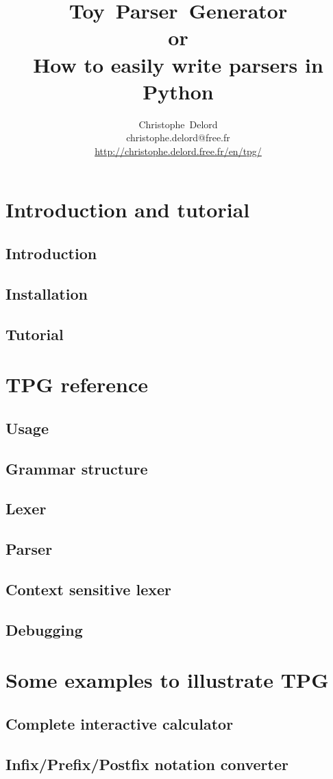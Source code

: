 \documentclass[a4paper,twoside]{report}
\author{
	Christophe~Delord\\
	christophe.delord@free.fr \\
	\url{http://christophe.delord.free.fr/en/tpg/} \\
}
\title{
	Toy~Parser~Generator \\
	or\\
	How to easily write parsers in Python \\
}
\begin{document}
\maketitle
\tableofcontents

\listoffigures

\cleardoublepage
\part{Introduction and tutorial}							\label{tpg:intro}
	\chapter{Introduction}
		
	\chapter{Installation}
		
	\chapter{Tutorial}										\label{tpg:tutorial}
		

\cleardoublepage
\part{TPG reference}										\label{tpg:core}
	\chapter{Usage}
		
	\chapter{Grammar structure}
		
	\chapter{Lexer}
		
	\chapter{Parser}
		
	\chapter{Context sensitive lexer}						\label{tpg:CSL}
		
    \chapter{Debugging}
        

\cleardoublepage
\part{Some examples to illustrate TPG}						\label{tpg:examples}
	\chapter{Complete interactive calculator}
		
	\chapter{Infix/Prefix/Postfix notation converter}
		
\end{document}
